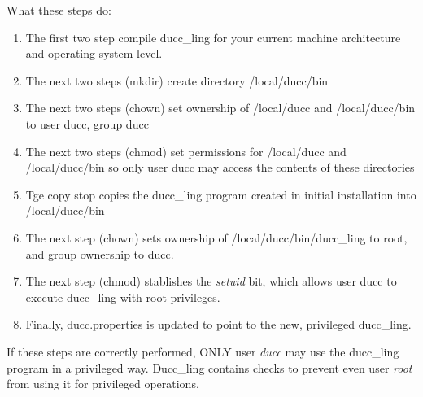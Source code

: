         What these steps do:
      \begin{enumerate}
          \item The first two step compile ducc\_ling for your current machine architecture and
            operating system level.
          \item The next two steps (mkdir) create directory /local/ducc/bin
          \item The next two steps (chown) set ownership of /local/ducc and /local/ducc/bin to user ducc,
            group ducc
          \item The next two steps (chmod) set permissions for /local/ducc and /local/ducc/bin so only user
            ducc may access the contents of these directories
          \item Tge copy stop copies the ducc\_ling program created in initial installation into /local/ducc/bin
          \item The next step (chown) sets ownership of /local/ducc/bin/ducc\_ling to root, and
            group ownership to ducc.
          \item The next step (chmod) stablishes the {\em setuid} bit, which allows user ducc to execute ducc\_ling
            with root privileges.
          \item Finally, ducc.properties is updated to point to the new, privileged ducc\_ling.
       \end{enumerate}
          
       If these steps are correctly performed, ONLY user {\em ducc} may use the ducc\_ling program in
       a privileged way. Ducc\_ling contains checks to prevent even user {\em root} from using it for
       privileged operations.

